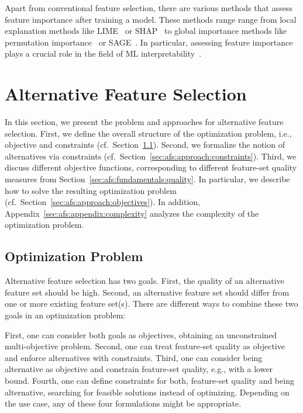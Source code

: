 \documentclass{article}
\theoremstyle{definition}
\begin{document}
Apart from conventional feature selection, there are various methods that assess feature importance after training a model.
These methods range range from local explanation methods like LIME~\cite{ribeiro2016should} or SHAP~\cite{lundberg2017unified} to global importance methods like permutation importance~\cite{breiman2001random} or SAGE~\cite{covert2020understanding}.
In particular, assessing feature importance plays a crucial role in the field of ML interpretability~\cite{carvalho2019machine, molnar2020interpretable}.

\section{Alternative Feature Selection}
\label{sec:afs:approach}

In this section, we present the problem and approaches for alternative feature selection.
First, we define the overall structure of the optimization problem, i.e., objective and constraints (cf.~Section~\ref{sec:afs:approach:problem}).
Second, we formalize the notion of alternatives via constraints (cf.~Section~\ref{sec:afs:approach:constraints}).
Third, we discuss different objective functions, corresponding to different feature-set quality measures from Section~\ref{sec:afs:fundamentals:quality}.
In particular, we describe how to solve the resulting optimization problem (cf.~Section~\ref{sec:afs:approach:objectives}).
In addition, Appendix~\ref{sec:afs:appendix:complexity} analyzes the complexity of the optimization problem.

\subsection{Optimization Problem}
\label{sec:afs:approach:problem}

Alternative feature selection has two goals.
First, the quality of an alternative feature set should be high.
Second, an alternative feature set should differ from one or more existing feature set(s).
There are different ways to combine these two goals in an optimization problem:

First, one can consider both goals as objectives, obtaining an unconstrained multi-objective problem.
Second, one can treat feature-set quality as objective and enforce alternatives with constraints.
Third, one can consider being alternative as objective and constrain feature-set quality, e.g., with a lower bound.
Fourth, one can define constraints for both, feature-set quality and being alternative, searching for feasible solutions instead of optimizing.
Depending on the use case, any of these four formulations might be appropriate.
\end{document}
